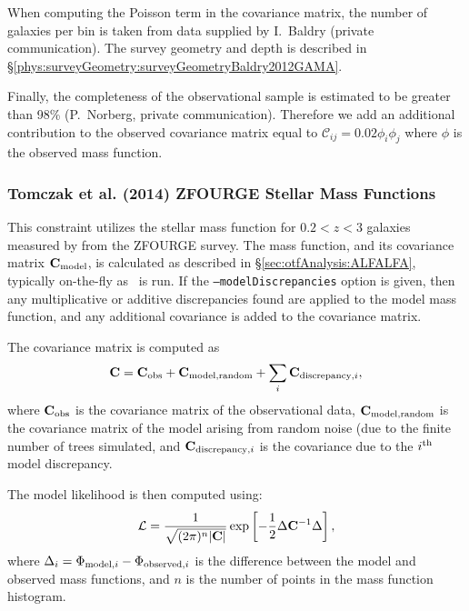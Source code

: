 When computing the Poisson term in the covariance matrix, the number of galaxies per bin is taken from data supplied by I.~Baldry (private communication). The survey geometry and depth is described in \S\ref{phys:surveyGeometry:surveyGeometryBaldry2012GAMA}.

Finally, the completeness of the observational sample is estimated to be greater than 98\% (P.~Norberg, private communication). Therefore we add an additional contribution to the observed covariance matrix equal to $\mathcal{C}_{ij} = 0.02 \phi_i \phi_j$ where $\phi$ is the observed mass function.

\subsubsection{Tomczak et al. (2014) ZFOURGE Stellar Mass Functions}\label{sec:AnalysisTomczakZFOURGEStellarMassFunction}

This constraint utilizes the stellar mass function for $0.2 < z< 3$ galaxies measured by \cite{tomczak_galaxy_2014} from the ZFOURGE survey. The mass function, and its covariance matrix ${\bf C}_{\rm model}$, is calculated as described in \S\ref{sec:otfAnalysis:ALFALFA}, typically on-the-fly as \glc\ is run. If the {\tt --modelDiscrepancies} option is given, then any multiplicative or additive discrepancies found are applied to the model mass function, and any additional covariance is added to the covariance matrix.

The covariance matrix is computed as
\begin{equation}
 {\bf C} = {\bf C}_{\rm obs} + {\bf C}_{\rm model,random} + \sum_i {\bf C}_{{\rm discrepancy}, i},
\end{equation}
where ${\bf C}_{\rm obs}$ is the covariance matrix of the observational data, ${\bf C}_{\rm model,random}$ is the covariance matrix of the model arising from random noise (due to the finite number of trees simulated, and ${\bf C}_{{\rm discrepancy}, i}$ is the covariance due to the $i^{\rm th}$ model discrepancy.

The model likelihood is then computed using:
\begin{equation}
 \mathcal{L} = {1 \over \sqrt{(2 \pi)^n |{\bf C}|}} \exp\left[ -{1\over 2} \Delta {\bf C}^{-1} \Delta \right],
\end{equation}
where $\Delta_i = \Phi_{{\rm model}, i} - \Phi_{{\rm observed}, i}$ is the difference between the model and observed mass functions, and $n$ is the number of points in the mass function histogram.

